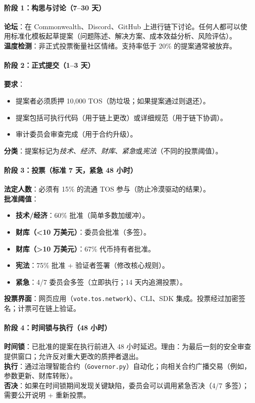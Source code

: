 \documentclass[11pt]{article}
\begin{document}
\paragraph{阶段 1：构思与讨论（7--30 天）}
\textbf{论坛}：在 Commonwealth、Discord、GitHub 上进行链下讨论。任何人都可以使用标准化模板起草提案（问题陈述、解决方案、成本效益分析、风险评估）。\\
\textbf{温度检测}：非正式投票衡量社区情绪。支持率低于 20\% 的提案通常被放弃。

\paragraph{阶段 2：正式提交（1--3 天）}
\textbf{要求}：
\begin{itemize}[noitemsep]
  \item 提案者必须质押 10,000 TOS（防垃圾；如果提案通过则退还）。
  \item 提案包括可执行代码（用于链上更改）或详细规范（用于链下协调）。
  \item 审计委员会审查完成（用于合约升级）。
\end{itemize}
\textbf{分类}：提案标记为\emph{技术}、\emph{经济}、\emph{财库}、\emph{紧急}或\emph{宪法}（不同的投票阈值）。

\paragraph{阶段 3：投票（标准 7 天，紧急 48 小时）}
\textbf{法定人数}：必须有 15\% 的流通 TOS 参与（防止冷漠驱动的结果）。\\
\textbf{批准阈值}：
\begin{itemize}[noitemsep]
  \item \textbf{技术/经济}：60\% 批准（简单多数加缓冲）。
  \item \textbf{财库（<10 万美元）}：委员会批准（多签）。
  \item \textbf{财库（>10 万美元）}：67\% 代币持有者批准。
  \item \textbf{宪法}：75\% 批准 + 验证者签署（修改核心规则）。
  \item \textbf{紧急}：4/7 委员会多签（立即执行；14 天内追溯投票）。
\end{itemize}
\textbf{投票界面}：网页应用（\texttt{vote.tos.network}）、CLI、SDK 集成。投票经过加密签名；计票可在链上验证。

\paragraph{阶段 4：时间锁与执行（48 小时）}
\textbf{时间锁}：已批准的提案在执行前进入 48 小时延迟。理由：为最后一刻的安全审查提供窗口；允许反对重大更改的质押者退出。\\
\textbf{执行}：通过治理智能合约（\texttt{Governor.py}）自动化；向相关合约广播交易（例如，参数更新、财库转账）。\\
\textbf{否决}：如果在时间锁期间发现关键缺陷，委员会可以调用紧急否决（4/7 多签）；需要公开说明 + 重新投票。
\end{document}
